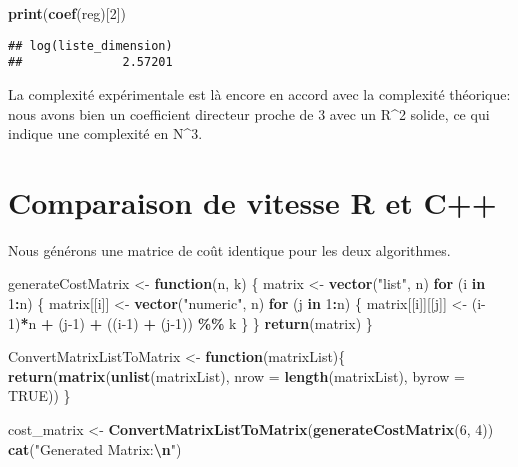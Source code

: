 \documentclass[
]{article}
\newenvironment{Shaded}{\begin{snugshade}}{\end{snugshade}}
\newcommand{\AttributeTok}[1]{\textcolor[rgb]{0.13,0.29,0.53}{#1}}
\newcommand{\ConstantTok}[1]{\textcolor[rgb]{0.56,0.35,0.01}{#1}}
\newcommand{\ControlFlowTok}[1]{\textcolor[rgb]{0.13,0.29,0.53}{\textbf{#1}}}
\newcommand{\DecValTok}[1]{\textcolor[rgb]{0.00,0.00,0.81}{#1}}
\newcommand{\FunctionTok}[1]{\textcolor[rgb]{0.13,0.29,0.53}{\textbf{#1}}}
\newcommand{\NormalTok}[1]{#1}
\newcommand{\OtherTok}[1]{\textcolor[rgb]{0.56,0.35,0.01}{#1}}
\newcommand{\SpecialCharTok}[1]{\textcolor[rgb]{0.81,0.36,0.00}{\textbf{#1}}}
\newcommand{\StringTok}[1]{\textcolor[rgb]{0.31,0.60,0.02}{#1}}
\begin{document}
\begin{Shaded}
\begin{Highlighting}[]
\FunctionTok{print}\NormalTok{(}\FunctionTok{coef}\NormalTok{(reg)[}\DecValTok{2}\NormalTok{])}
\end{Highlighting}
\end{Shaded}

\begin{verbatim}
## log(liste_dimension) 
##              2.57201
\end{verbatim}

La complexité expérimentale est là encore en accord avec la complexité
théorique: nous avons bien un coefficient directeur proche de 3 avec un
R\^{}2 solide, ce qui indique une complexité en N\^{}3.

\hypertarget{comparaison-de-vitesse-r-et-c}{%
\section{Comparaison de vitesse R et
C++}\label{comparaison-de-vitesse-r-et-c}}

Nous générons une matrice de coût identique pour les deux algorithmes.

\begin{Shaded}
\begin{Highlighting}[]
\NormalTok{generateCostMatrix }\OtherTok{\textless{}{-}} \ControlFlowTok{function}\NormalTok{(n, k) \{}
\NormalTok{  matrix }\OtherTok{\textless{}{-}} \FunctionTok{vector}\NormalTok{(}\StringTok{"list"}\NormalTok{, n)}
  \ControlFlowTok{for}\NormalTok{ (i }\ControlFlowTok{in} \DecValTok{1}\SpecialCharTok{:}\NormalTok{n) \{}
\NormalTok{    matrix[[i]] }\OtherTok{\textless{}{-}} \FunctionTok{vector}\NormalTok{(}\StringTok{"numeric"}\NormalTok{, n)}
    \ControlFlowTok{for}\NormalTok{ (j }\ControlFlowTok{in} \DecValTok{1}\SpecialCharTok{:}\NormalTok{n) \{}
\NormalTok{      matrix[[i]][[j]] }\OtherTok{\textless{}{-}}\NormalTok{ (i}\DecValTok{{-}1}\NormalTok{)}\SpecialCharTok{*}\NormalTok{n }\SpecialCharTok{+}\NormalTok{ (j}\DecValTok{{-}1}\NormalTok{) }\SpecialCharTok{+}\NormalTok{ ((i}\DecValTok{{-}1}\NormalTok{) }\SpecialCharTok{+}\NormalTok{ (j}\DecValTok{{-}1}\NormalTok{)) }\SpecialCharTok{\%\%}\NormalTok{ k}
\NormalTok{    \}}
\NormalTok{  \}}
  \FunctionTok{return}\NormalTok{(matrix)}
\NormalTok{\}}

\NormalTok{ConvertMatrixListToMatrix }\OtherTok{\textless{}{-}} \ControlFlowTok{function}\NormalTok{(matrixList)\{}
  \FunctionTok{return}\NormalTok{(}\FunctionTok{matrix}\NormalTok{(}\FunctionTok{unlist}\NormalTok{(matrixList), }\AttributeTok{nrow =} \FunctionTok{length}\NormalTok{(matrixList), }\AttributeTok{byrow =} \ConstantTok{TRUE}\NormalTok{))}
\NormalTok{\}}

\NormalTok{cost\_matrix }\OtherTok{\textless{}{-}} \FunctionTok{ConvertMatrixListToMatrix}\NormalTok{(}\FunctionTok{generateCostMatrix}\NormalTok{(}\DecValTok{6}\NormalTok{, }\DecValTok{4}\NormalTok{))}
\FunctionTok{cat}\NormalTok{(}\StringTok{"Generated Matrix:}\SpecialCharTok{\textbackslash{}n}\StringTok{"}\NormalTok{)}
\end{Highlighting}
\end{Shaded}
\end{document}
